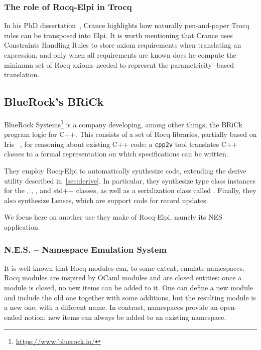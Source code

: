 \documentclass[a4paper, 11pt]{book}
\begin{document}
\subsubsection{The role of Rocq-Elpi in Trocq}

In his PhD dissertation~\cite[Page 115]{enzo}, Crance highlights how naturally
pen-and-paper Trocq rules can be transposed into Elpi. It is worth mentioning
that Crance uses Constraints Handling Rules to store axiom requirements when
translating an expression, and only when all requirements are known does he
compute the minimum set of Rocq axioms needed to represent the parametricity-
based translation.



\subsection{BlueRock's BRiCk}


BlueRock Systems\footnote{\url{https://www.bluerock.io/}} is a company
developing, among other things, the BRiCk program logic for C++. This consists
of a set of Rocq libraries, partially based on Iris
~\cite{10.1145/2676726.2676980,10.1007/978-3-662-54434-1_26}, for reasoning
about existing C++ code: a \texttt{cpp2v} tool translates C++ classes to a
formal representation on which specifications can be written.

They employ Rocq-Elpi to automatically synthesize code, extending the derive
utility described in~\cref{sec:derive}. In particular, they synthesize type
class instances for the , , ,
and  std++ classes, as well as a serialization class called
. Finally, they also synthesize Lenses, which are support code for
record updates.

We focus here on another use they make of Rocq-Elpi, namely its NES
application.

\subsubsection{N.E.S. -- Namespace Emulation System}

It is well known that Rocq modules can, to some extent, emulate namespaces.
Rocq modules are inspired by OCaml modules and are closed entities: once a
module is closed, no new items can be added to it. One can define a new module
and include the old one together with some additions, but the resulting module
is a new one, with a different name. In contrast, namespaces provide an open-
ended notion: new items can always be added to an existing namespace.
\end{document}
